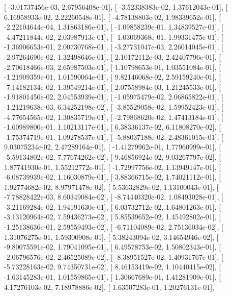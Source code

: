 \documentclass{article}
\begin{document}
       [ -3.01737456e-03,   2.67956408e-01],
       [ -3.52338383e-02,   1.37612043e-01],
       [  6.16958933e-02,   2.22260548e-01],
       [ -4.78138803e-02,   1.98339652e-01],
       [ -2.22104644e-04,   1.31863186e-01],
       [ -1.09858239e-01,   1.34839527e-01],
       [ -4.47211844e-02,   2.03987913e-01],
       [ -1.03069368e-01,   1.99331475e-01],
       [ -1.36906653e-01,   2.00730768e-01],
       [ -3.27731047e-03,   2.26014045e-01],
       [ -2.97264690e-02,   1.32498646e-01],
       [  2.10172112e-03,   2.42407796e-01],
       [ -2.70618466e-03,   2.65987503e-01],
       [  1.10798653e-01,   1.03551084e-01],
       [ -1.21909359e-01,   1.01590064e-01],
       [  9.82146068e-02,   2.59159240e-01],
       [ -7.14182134e-02,   1.39549214e-01],
       [  2.07558984e-03,   1.21245533e-01],
       [ -1.91801450e-02,   2.04553939e-01],
       [ -1.05975479e-02,   2.06865822e-01],
       [ -1.21219638e-03,   6.34252198e-02],
       [ -3.85529058e-02,   1.59952423e-01],
       [ -4.77654565e-02,   1.30835719e-01],
       [ -2.79868620e-02,   1.47413184e-01],
       [ -1.60989800e-01,   1.10213117e-01],
       [  6.38336137e-02,   6.11808270e-02],
       [ -1.75374719e-01,   1.09278537e-01],
       [ -5.88037188e-02,   2.48361015e-01],
       [  9.03075234e-02,   2.47289164e-01],
       [ -1.41279962e-01,   1.77960999e-01],
       [ -5.59134802e-02,   7.77674262e-02],
       [  9.46856924e-02,   9.03267797e-02],
       [  1.87741930e-01,   1.55212772e-01],
       [ -1.72997756e-02,   1.13949147e-01],
       [ -6.08739939e-02,   1.16030879e-01],
       [  3.88366715e-02,   1.74021112e-01],
       [  1.92774682e-02,   8.97971478e-02],
       [  5.53632829e-02,   1.13100043e-01],
       [ -7.78828422e-03,   8.60349084e-02],
       [ -8.74440320e-02,   1.08493028e-01],
       [ -3.21169284e-02,   1.94191630e-01],
       [  6.03732712e-02,   1.64801263e-01],
       [ -3.13120964e-02,   7.59436273e-02],
       [  5.85539652e-02,   1.45492802e-01],
       [ -1.25138636e-01,   2.59559493e-02],
       [ -6.71104089e-02,   2.75136034e-02],
       [  1.31076275e-01,   1.59300908e-01],
       [  5.38243094e-02,   3.14654946e-02],
       [ -9.80075591e-02,   1.79041095e-01],
       [  6.49578753e-02,   1.50802343e-01],
       [ -2.06796576e-02,   2.46525089e-02],
       [ -8.38951527e-02,   1.40931767e-01],
       [ -5.73228163e-02,   9.74350731e-02],
       [  8.46153419e-02,   1.10440415e-02],
       [ -1.63145283e-01,   1.01559865e-01],
       [  1.30667689e-01,   1.41281909e-01],
       [  4.17276103e-02,   7.18978886e-02],
       [  1.63507283e-01,   1.20276131e-01],
\end{document}
